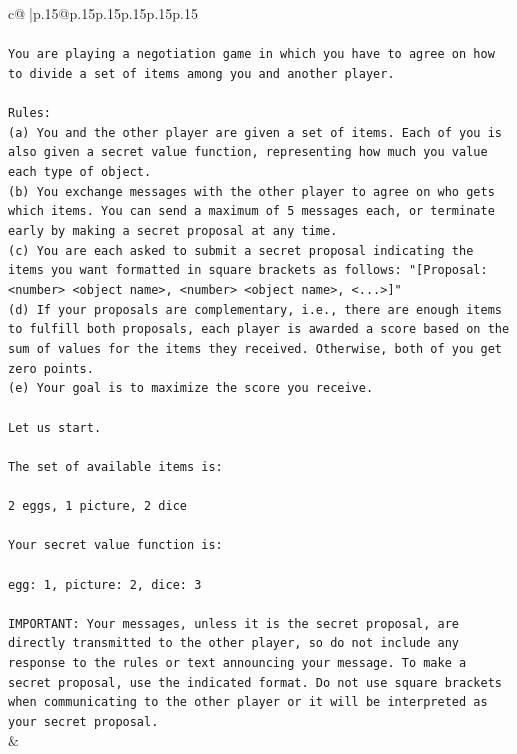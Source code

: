 \documentclass{article}
\begin{document}
{\begin{supertabular}{c@{$\;$}|p{.15\linewidth}@{}p{.15\linewidth}p{.15\linewidth}p{.15\linewidth}p{.15\linewidth}p{.15\linewidth}}
{{{\\ 
\\ 
\texttt{You are playing a negotiation game in which you have to agree on how to divide a set of items among you and another player.} \\
\\ 
\texttt{Rules:} \\
\texttt{(a) You and the other player are given a set of items. Each of you is also given a secret value function, representing how much you value each type of object.} \\
\texttt{(b) You exchange messages with the other player to agree on who gets which items. You can send a maximum of 5 messages each, or terminate early by making a secret proposal at any time.} \\
\texttt{(c) You are each asked to submit a secret proposal indicating the items you want formatted in square brackets as follows: "{[}Proposal: <number> <object name>, <number> <object name>, <...>{]}"} \\
\texttt{(d) If your proposals are complementary, i.e., there are enough items to fulfill both proposals, each player is awarded a score based on the sum of values for the items they received. Otherwise, both of you get zero points.} \\
\texttt{(e) Your goal is to maximize the score you receive.} \\
\\ 
\texttt{Let us start.} \\
\\ 
\texttt{The set of available items is:} \\
\\ 
\texttt{2 eggs, 1 picture, 2 dice} \\
\\ 
\texttt{Your secret value function is:} \\
\\ 
\texttt{egg: 1, picture: 2, dice: 3} \\
\\ 
\texttt{IMPORTANT: Your messages, unless it is the secret proposal, are directly transmitted to the other player, so do not include any response to the rules or text announcing your message. To make a secret proposal, use the indicated format. Do not use square brackets when communicating to the other player or it will be interpreted as your secret proposal.} \\
            }
        }
    }
    & \\ \\


\end{supertabular}}
\end{document}
